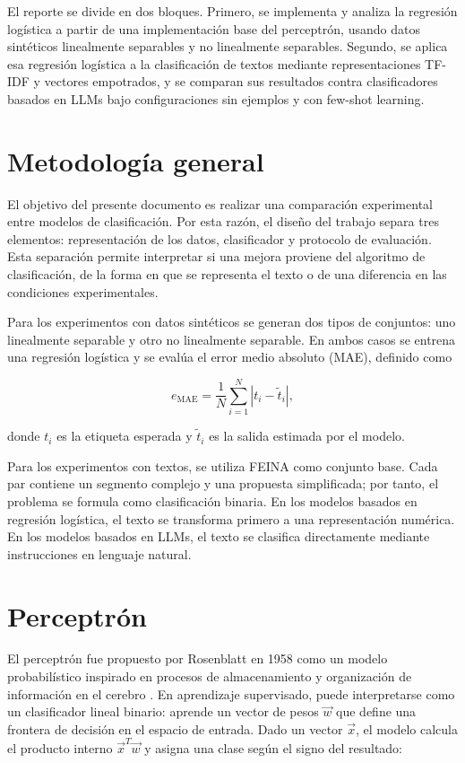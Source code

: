\documentclass[12pt]{article}
\begin{document}
El reporte se divide en dos bloques. Primero, se implementa y analiza la regresión logística a partir de una implementación base del perceptrón, usando datos sintéticos linealmente separables y no linealmente separables. Segundo, se aplica esa regresión logística a la clasificación de textos mediante representaciones TF-IDF y vectores empotrados, y se comparan sus resultados contra clasificadores basados en LLMs bajo configuraciones sin ejemplos y con few-shot learning.

\section{Metodología general}

El objetivo del presente documento es realizar una comparación experimental entre modelos de clasificación. Por esta razón, el diseño del trabajo separa tres elementos: representación de los datos, clasificador y protocolo de evaluación. Esta separación permite interpretar si una mejora proviene del algoritmo de clasificación, de la forma en que se representa el texto o de una diferencia en las condiciones experimentales.

Para los experimentos con datos sintéticos se generan dos tipos de conjuntos: uno linealmente separable y otro no linealmente separable. En ambos casos se entrena una regresión logística y se evalúa el error medio absoluto (MAE), definido como

\begin{equation}
e_{\text{MAE}} = \frac{1}{N}\sum_{i=1}^{N}|t_i - \tilde{t}_i|,
\end{equation}

donde $t_i$ es la etiqueta esperada y $\tilde{t}_i$ es la salida estimada por el modelo.

Para los experimentos con textos, se utiliza FEINA como conjunto base. Cada par contiene un segmento complejo y una propuesta simplificada; por tanto, el problema se formula como clasificación binaria. En los modelos basados en regresión logística, el texto se transforma primero a una representación numérica. En los modelos basados en LLMs, el texto se clasifica directamente mediante instrucciones en lenguaje natural.

\section{Perceptrón}

El perceptrón fue propuesto por Rosenblatt en 1958 como un modelo probabilístico inspirado en procesos de almacenamiento y organización de información en el cerebro \cite{rosenblatt1958perceptron}. En aprendizaje supervisado, puede interpretarse como un clasificador lineal binario: aprende un vector de pesos $\vec w$ que define una frontera de decisión en el espacio de entrada. Dado un vector $\vec x$, el modelo calcula el producto interno $\vec x^T \vec w$ y asigna una clase según el signo del resultado:
\end{document}
